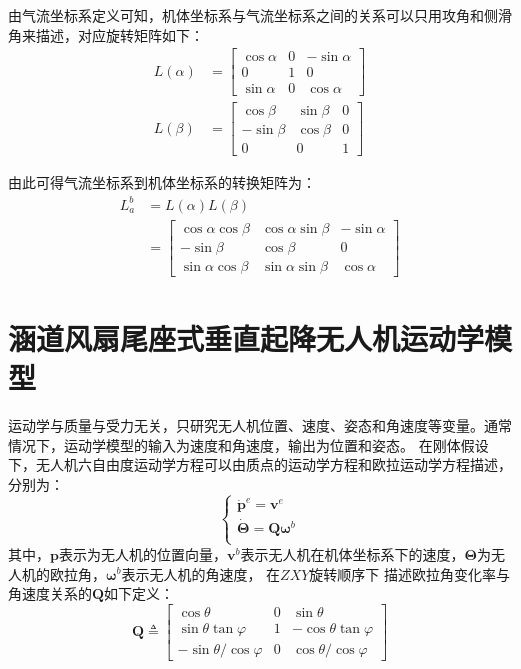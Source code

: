 由气流坐标系定义可知，机体坐标系与气流坐标系之间的关系可以只用攻角和侧滑角来描述，对应旋转矩阵如下：
\begin{align}
    L(\alpha)&=
    \begin{bmatrix}
    \cos\alpha&  0& -\sin\alpha\\
    0&  1& 0\\
    \sin\alpha &  0& \cos\alpha 
    \end{bmatrix} \\
    L(\beta)&=
    \begin{bmatrix}
    \cos\beta&  \sin\beta& 0\\
    -\sin\beta&  \cos\beta& 0\\
    0 &  0& 1 
    \end{bmatrix}
\end{align}

由此可得气流坐标系到机体坐标系的转换矩阵为：
\begin{align}
    L_{a}^{b}&= L(\alpha)L(\beta) \nonumber \\
    &=
    \begin{bmatrix}
    \cos\alpha\cos\beta&  \cos\alpha\sin\beta& -\sin\alpha\\
    -\sin\beta&  \cos\beta& 0\\
    \sin\alpha\cos\beta &  \sin\alpha\sin\beta& \cos\alpha 
    \end{bmatrix} 
    \label{eq:Lab}
\end{align}
\section{涵道风扇尾座式垂直起降无人机运动学模型}
运动学与质量与受力无关，只研究无人机位置、速度、姿态和角速度等变量。通常情况下，运动学模型的输入为速度和角速度，输出为位置和姿态。
在刚体假设下，无人机六自由度运动学方程可以由质点的运动学方程和欧拉运动学方程描述，分别为：
\begin{equation}
    \left\{\begin{array}{l}
        {\dot{\mathbf{p}}}^{e}={\mathbf{v}}^{e} \\
        \dot{\mathbf{\Theta}}=\mathbf{Q} {\mathbf{\omega}}^{b} \\
        \end{array}\right.
\end{equation}
其中，$\mathbf{p}$表示为无人机的位置向量，$\mathbf{v}^{b}$表示无人机在机体坐标系下的速度，$\mathbf{\Theta}$为无人机的欧拉角，${\mathbf{\omega}}^{b}$表示无人机的角速度，
在$ZXY$旋转顺序下
描述欧拉角变化率与角速度关系的$\mathbf{Q}$如下定义：
\begin{equation}
    \mathbf{Q} \triangleq\left[\begin{array}{ccc}
        \cos\theta & 0 & \sin\theta \\
        \sin\theta\tan\varphi  & 1 & -\cos\theta\tan\varphi  \\
        -\sin\theta/\cos\varphi  & 0 & \cos\theta/ \cos\varphi
        \end{array}\right]
\end{equation}
